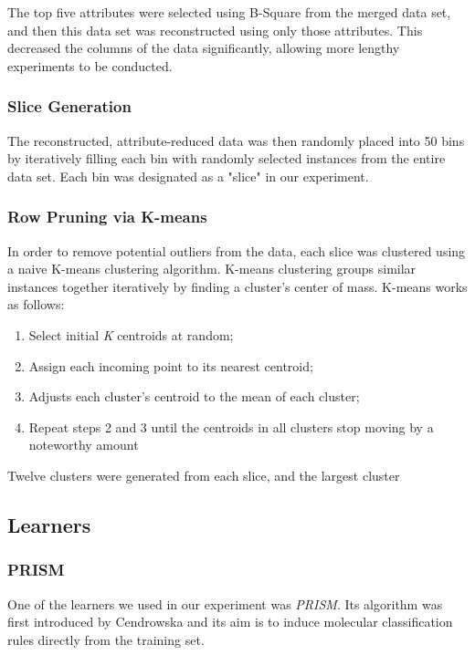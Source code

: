 \documentclass{sig-alternate}
\begin{document}
The top five attributes were selected using B-Square from the merged data set, and then this data set was reconstructed using only those attributes. This decreased the columns of the data significantly, allowing more lengthy experiments to be conducted.

\subsubsection{Slice Generation}

The reconstructed, attribute-reduced data was then randomly placed into 50 bins by iteratively filling each bin with randomly selected instances from the entire data set. Each bin was designated as a "slice" in our experiment.

\subsubsection{Row Pruning via K-means}

In order to remove potential outliers from the data, each slice was clustered using a naive K-means clustering algorithm. K-means clustering groups similar instances together iteratively by finding a cluster's center of mass. K-means works as follows:

\begin{centering}
\begin{enumerate}
\item{Select initial {\em K} centroids at random;}
\item{Assign each incoming point to its nearest centroid;}
\item{Adjusts each cluster's centroid to the mean of each cluster;}
\item{Repeat steps 2 and 3 until the centroids in all clusters stop moving by a noteworthy amount}
\end{enumerate}
\end{centering}

Twelve clusters were generated from each slice, and the largest cluster

\subsection{Learners}
\subsubsection{PRISM}
One of the learners we used in our experiment was {\em PRISM}. Its algorithm was first introduced by Cendrowska and its aim is to induce molecular classification rules directly from the training set.
\end{document}
